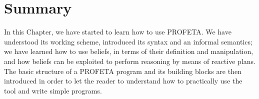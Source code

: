 \section{Summary}
In this Chapter, we have started to learn how to use PROFETA.
We have understood its working scheme, introduced its syntax and an
informal semantics;
we have learned how to use beliefs, in terms of their definition and
manipulation, and how beliefs can be exploited to perform reasoning by
means of reactive plans.
The basic structure of a PROFETA program and its building blocks are then
introduced in order to let the reader to understand how to practically use
the tool and write simple programs.



